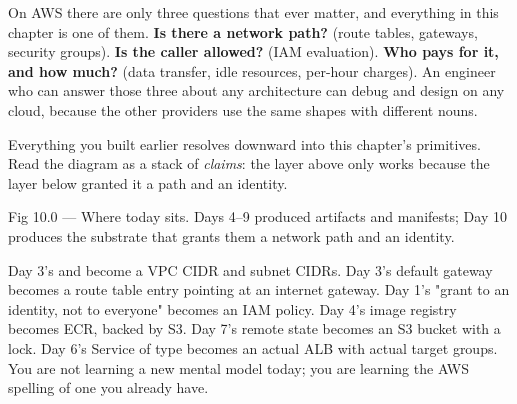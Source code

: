 \begin{keyidea}
On AWS there are only three questions that ever matter, and everything in this chapter is one of them. \textbf{Is there a network path?} (route tables, gateways, security groups). \textbf{Is the caller allowed?} (IAM evaluation). \textbf{Who pays for it, and how much?} (data transfer, idle resources, per-hour charges). An engineer who can answer those three about any architecture can debug and design on any cloud, because the other providers use the same shapes with different nouns.
\end{keyidea}

 Everything you built earlier resolves downward into this chapter's primitives. Read the diagram as a stack of \emph{claims}: the layer above only works because the layer below granted it a path and an identity.

\begin{wbfigure}{Fig 10.0 — Where today sits. Days 4--9 produced artifacts and manifests; Day 10 produces the substrate that grants them a network path and an identity.}
\end{wbfigure}

 Day 3's  and  become a VPC CIDR and subnet CIDRs. Day 3's default gateway becomes a route table entry pointing at an internet gateway. Day 1's "grant to an identity, not to everyone" becomes an IAM policy. Day 4's image registry becomes ECR, backed by S3. Day 7's remote state becomes an S3 bucket with a lock. Day 6's Service of type  becomes an actual ALB with actual target groups. You are not learning a new mental model today; you are learning the AWS spelling of one you already have.

